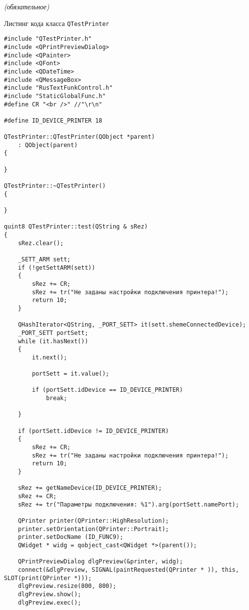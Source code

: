 \label{sec:appendix_c}


\begin{center}
	\normalfont\normalsize{\textit{(обязательное)}}

	\normalfont\normalsize{Листинг кода класса \texttt{QTestPrinter}}
\end{center}

\begin{verbatim}
#include "QTestPrinter.h"
#include <QPrintPreviewDialog>
#include <QPainter>
#include <QFont>
#include <QDateTime>
#include <QMessageBox>
#include "RusTextFunkControl.h"
#include "StaticGlobalFunc.h"
#define CR "<br />" //"\r\n"

#define ID_DEVICE_PRINTER 18

QTestPrinter::QTestPrinter(QObject *parent)
	: QObject(parent)
{

}

QTestPrinter::~QTestPrinter()
{

}

quint8 QTestPrinter::test(QString & sRez)
{
	sRez.clear();

	_SETT_ARM sett;
	if (!getSettARM(sett))
	{
		sRez += CR;
		sRez += tr("Не заданы настройки подключения принтера!");
		return 10;
	}

	QHashIterator<QString, _PORT_SETT> it(sett.shemeConnectedDevice);
	_PORT_SETT portSett;
	while (it.hasNext())
	{
		it.next();

		portSett = it.value();

		if (portSett.idDevice == ID_DEVICE_PRINTER)
			break;

	}

	if (portSett.idDevice != ID_DEVICE_PRINTER)
	{
		sRez += CR;
		sRez += tr("Не заданы настройки подключения принтера!");
		return 10;
	}

	sRez += getNameDevice(ID_DEVICE_PRINTER);
	sRez += CR;
	sRez += tr("Параметры подключения: %1").arg(portSett.namePort);

	QPrinter printer(QPrinter::HighResolution);
	printer.setOrientation(QPrinter::Portrait);
	printer.setDocName (ID_FUNC9);
	QWidget * widg = qobject_cast<QWidget *>(parent());

	QPrintPreviewDialog dlgPreview(&printer, widg);
	connect(&dlgPreview, SIGNAL(paintRequested(QPrinter * )), this, SLOT(print(QPrinter *)));
	dlgPreview.resize(800, 800);
	dlgPreview.show();
	dlgPreview.exec();


\end{verbatim}
